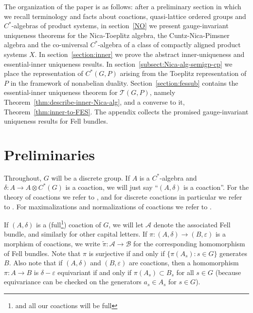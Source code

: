 \documentclass[12pt]{amsart}
\theoremstyle{plain}
\theoremstyle{remark}
\theoremstyle{definition}
\numberwithin{equation}{section}
\theoremstyle{plain}
\theoremstyle{definition}
\theoremstyle{remark}
\begin{document}
The organization of the paper is as follows: after a preliminary section in which we recall terminology and facts about
coactions, quasi-lattice ordered groups and $C^*$-algebras of product systems, in section~\ref{NO} we present gauge-invariant
uniqueness theorems for the Nica-Toeplitz algebra, the Cuntz-Nica-Pimsner algebra and the co-universal $C^*$-algebra
of a class of compactly aligned product systems $X$. In section~\ref{section:inner} we prove the abstract inner-uniqueness and
essential-inner uniqueness results. In section~\ref{subsect:Nica-alg-semigp-cp} we place the representation of
$C^*(G, P)$ arising from the Toeplitz representation of $P$ in the framework of nonabelian duality.
Section~\ref{section:fessub} contains the essential-inner uniqueness theorem for
${\mathcal T}(G, P)$, namely  Theorem~\ref{thm:describe-inner-Nica-alg}, and a converse to it, Theorem~\ref{thm:inner-to-FES}. The appendix
collects the promised gauge-invariant uniqueness results for Fell bundles.

\section{Preliminaries}
\label{prelim}

Throughout, $G$ will be a discrete group.
If $A$ is a $C^*$-algebra and $\delta:A\to A\otimes C^*(G)$ is a coaction, we will just say ``$(A,\delta)$ is a coaction''.
For the theory of coactions we refer to \cite[Appendix~A]{BE}, and for discrete coactions in particular we refer to \cite{EKQ, QuiggDiscrete}.
For maximalizations and normalizations of coactions we refer to \cite{clda, nordfjordeid}.

If $(A,\delta)$ is a (full\footnote{and all our coactions will be full}) coaction of $G$, we will let ${\mathcal A}$ denote the associated Fell bundle, and similarly for other capital letters.
If $\pi:(A,\delta)\to (B,\varepsilon)$ is a morphism of coactions, we write $\tilde{\pi}:{\mathcal A} \to {\mathcal B}$ for the corresponding homomorphism of
Fell bundles. Note that $\pi$ is surjective
if and only if $\{\pi(A_s):s\in G\}$ generates $B$.
Also note that if $(A,\delta)$ and $(B,\varepsilon)$ are coactions, then  a homomorphism $\pi:A\to B$ is $\delta-\varepsilon$ equivariant if and only if $\pi(A_s)\subset B_s$ for all $s\in G$ (because equivariance can be checked on the generators $a_s\in A_s$ for $s\in G$).
\end{document}
